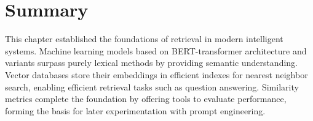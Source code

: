 \section{Summary}
This chapter established the foundations of retrieval in modern intelligent systems. Machine learning models based on \gls{BERT}-transformer \cite{bertpretrainingdeepbidirectional} architecture and variants surpass purely lexical methods by providing semantic understanding. Vector databases store their embeddings in efficient indexes for nearest neighbor search, enabling efficient retrieval tasks such as question answering. Similarity metrics complete the foundation by offering tools to evaluate performance, forming the basis for later experimentation with prompt engineering.












